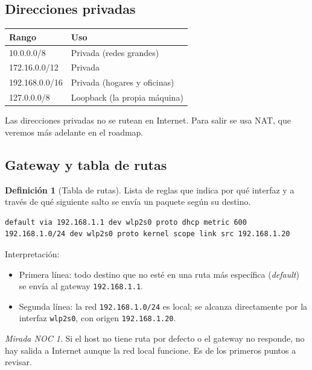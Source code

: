 \documentclass[11pt,a4paper]{article}
\theoremstyle{definition}
\newtheorem{definicion}{Definición}[section]
\theoremstyle{remark}
\newtheorem{noc}{Mirada NOC}[section]
\begin{document}
\subsection{Direcciones privadas}

\begin{center}
\begin{tabular}{@{}ll@{}}
\toprule
\textbf{Rango} & \textbf{Uso}\\
\midrule
10.0.0.0/8 & Privada (redes grandes)\\
172.16.0.0/12 & Privada\\
192.168.0.0/16 & Privada (hogares y oficinas)\\
127.0.0.0/8 & Loopback (la propia máquina)\\
\bottomrule
\end{tabular}
\end{center}

Las direcciones privadas no se rutean en Internet. Para salir se usa NAT, que veremos más adelante en el roadmap.

\subsection{Gateway y tabla de rutas}

\begin{definicion}[Tabla de rutas]
Lista de reglas que indica por qué interfaz y a través de qué siguiente salto se envía un paquete según su destino.
\end{definicion}

\begin{lstlisting}[style=console]
default via 192.168.1.1 dev wlp2s0 proto dhcp metric 600
192.168.1.0/24 dev wlp2s0 proto kernel scope link src 192.168.1.20
\end{lstlisting}

Interpretación:
\begin{itemize}
  \item Primera línea: todo destino que no esté en una ruta más específica (\emph{default}) se envía al gateway \texttt{192.168.1.1}.
  \item Segunda línea: la red \texttt{192.168.1.0/24} es local; se alcanza directamente por la interfaz \texttt{wlp2s0}, con origen \texttt{192.168.1.20}.
\end{itemize}

\begin{noc}
Si el host no tiene ruta por defecto o el gateway no responde, no hay salida a Internet aunque la red local funcione. Es de los primeros puntos a revisar.
\end{noc}
\end{document}
